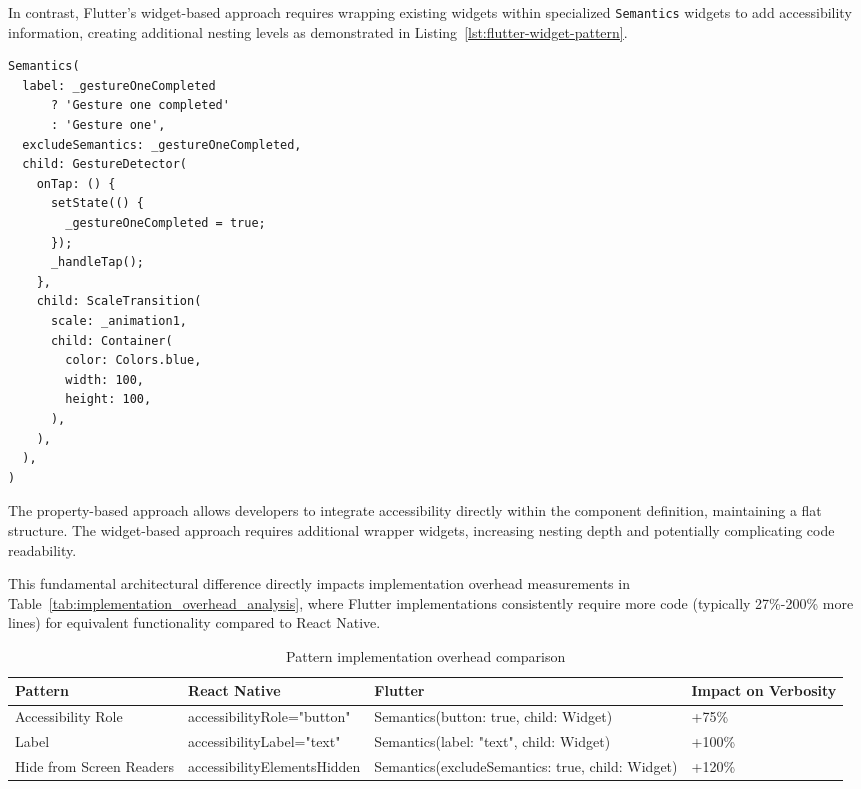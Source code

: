 \pagebreak

In contrast, Flutter's widget-based approach requires wrapping existing widgets within specialized \texttt{Semantics} widgets to add accessibility information, creating additional nesting levels as demonstrated in Listing~\ref{lst:flutter-widget-pattern}.

\begin{lstlisting}[style=DartStyle, caption=Widget-based accessibility pattern in Flutter, label=lst:flutter-widget-pattern]
Semantics(
  label: _gestureOneCompleted 
      ? 'Gesture one completed' 
      : 'Gesture one',
  excludeSemantics: _gestureOneCompleted,
  child: GestureDetector(
    onTap: () {
      setState(() {
        _gestureOneCompleted = true;
      });
      _handleTap();
    },
    child: ScaleTransition(
      scale: _animation1,
      child: Container(
        color: Colors.blue,
        width: 100,
        height: 100,
      ),
    ),
  ),
)
\end{lstlisting}

\pagebreak

The property-based approach allows developers to integrate accessibility directly within the component definition, maintaining a flat structure. The widget-based approach requires additional wrapper widgets, increasing nesting depth and potentially complicating code readability.

This fundamental architectural difference directly impacts implementation overhead measurements in Table~\ref{tab:implementation_overhead_analysis}, where Flutter implementations consistently require more code (typically 27\%-200\% more lines) for equivalent functionality compared to React Native.

\begin{table}[ht]
\caption{Pattern implementation overhead comparison}
\label{tab:pattern_implementation_comparison}
\centering
\begin{tabular}{|P{4cm}|P{3.5cm}|P{3.5cm}|P{3cm}|}
\hline
\textbf{Pattern} & \textbf{React Native} & \textbf{Flutter} & \textbf{Impact on Verbosity} \\
\hline
Accessibility Role & accessibilityRole="button" & Semantics(button: true, child: Widget) & +75\% \\
\hline
Label & accessibilityLabel="text" & Semantics(label: "text", child: Widget) & +100\% \\
\hline
Hide from Screen Readers & accessibilityElementsHidden & Semantics(excludeSemantics: true, child: Widget) & +120\% \\
\hline
\end{tabular}
\end{table}

